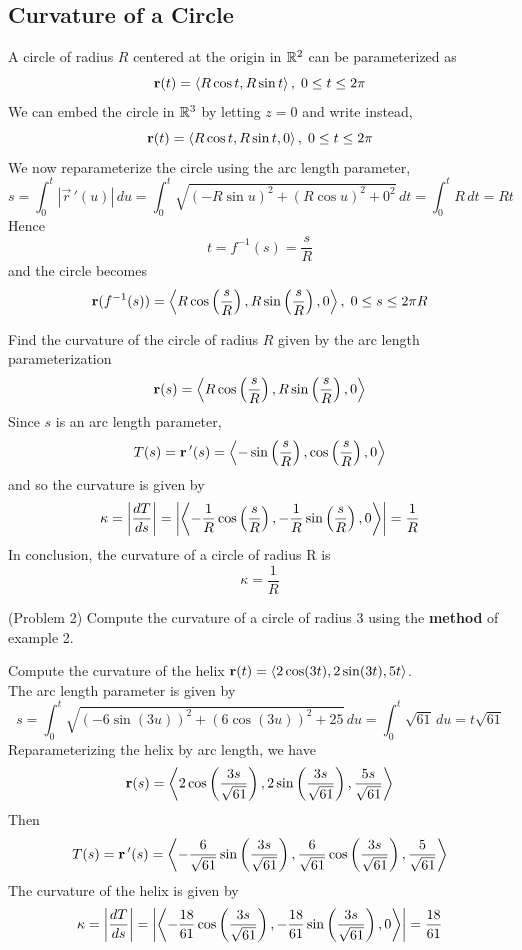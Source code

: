 \documentclass[handout]{ximera}
\begin{document}
\subsection{Curvature of a Circle}
A circle of radius $R$ centered at the origin in $\mathbb R^2$ can be parameterized as
\[
\mathbf r(t) = \left\langle R\cos t, R\sin t\right\rangle, \; 0\leq t \leq 2\pi
\]
We can embed the circle in $\mathbb R^3$ by letting $z = 0$ and write instead,
\[
\mathbf r(t) = \left\langle R\cos t, R\sin t, 0\right\rangle, \; 0\leq t \leq 2\pi
\]
We now reparameterize the circle using the arc length parameter,
\[
s = \int_0^t |\vec r\,'(u)| \, du = \int_0^t \sqrt{ (-R\sin u)^2 + (R\cos u)^2 + 0^2} \, dt = \int_0^t R \, dt = Rt
\]
Hence 
\[
t = f^{-1}(s) = \frac{s}{R}
\]
and the circle becomes
\[
\mathbf r(f^{-1}(s)) = \left\langle R \cos\left(\frac{s}{R}\right), R \sin\left(\frac{s}{R}\right), 0\right\rangle, \; 0 \leq s \leq 2\pi R
\]
\begin{example}[Example 2]
Find the curvature of the circle of radius $R$ given by the arc length parameterization
\[
\mathbf r(s) = \left\langle R \cos\left(\frac{s}{R}\right), R \sin\left(\frac{s}{R}\right), 0\right\rangle
\]
Since $s$ is an arc length parameter, 
\[
T(s) = \mathbf r\,'(s) = \left\langle -\sin\left(\frac{s}{R}\right), \cos\left(\frac{s}{R}\right), 0\right\rangle
\]
and so the curvature is given by
\[
\kappa = \left|\frac{dT}{ds}\right| = \left|\left\langle -\frac{1}{R}\cos\left(\frac{s}{R}\right), -\frac{1}{R}\sin\left(\frac{s}{R}\right), 0\right\rangle\right| = \frac{1}{R}
\]
In conclusion, the curvature of a circle of radius R is 
\[
\kappa = \frac{1}{R}
\]
\end{example}

\begin{problem}(Problem 2)
Compute the curvature of a circle of radius 3 using the \textbf{method} of example 2.
\end{problem}

\begin{example}[Example 3]
Compute the curvature of the helix $\mathbf r(t) = \left\langle 2\cos(3t), 2 \sin(3t), 5t\right\rangle$.\\
The arc length parameter is given by
\[
s = \int_0^t \sqrt{\left(-6\sin(3u) \right)^2+\left(6\cos(3u) \right)^2 + 25} \, du = \int_0^t \sqrt{61} \, du = t\sqrt{61}
\]
Reparameterizing the helix by arc length, we have
\[
\mathbf r(s) = \left\langle 2\cos\left(\frac{3s}{\sqrt{61}}\right), 2 \sin\left(\frac{3s}{\sqrt{61}}\right), \frac{5s}{\sqrt{61}}\right\rangle
\]
Then
\[
T(s) = \mathbf r\,'(s) = \left\langle -\frac{6}{\sqrt{61}}\sin\left(\frac{3s}{\sqrt{61}}\right), \frac{6}{\sqrt{61}}\cos\left(\frac{3s}{\sqrt{61}}\right), \frac{5}{\sqrt{61}}\right\rangle
\]
The curvature of the helix is given by
\[
\kappa = \left| \frac{dT}{ds} \right| = \left|\left\langle -\frac{18}{61}\cos\left(\frac{3s}{\sqrt{61}}\right), -\frac{18}{61}\sin\left(\frac{3s}{\sqrt{61}}\right), 0\right\rangle\right| = \frac{18}{61}
\]
\end{example}
\end{document}

